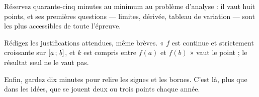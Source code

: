Réservez quarante-cinq minutes au minimum au problème d'analyse : il vaut huit
points, et ses premières questions — limites, dérivée, tableau de variation —
sont les plus accessibles de toute l'épreuve.

Rédigez les justifications attendues, même brèves. « $f$ est continue et
strictement croissante sur $\left[a\,;\,b\right]$, et $k$ est compris entre
$f(a)$ et $f(b)$ » vaut le point ; le résultat seul ne le vaut pas.

Enfin, gardez dix minutes pour relire les signes et les bornes. C'est là,
plus que dans les idées, que se jouent deux ou trois points chaque année.
